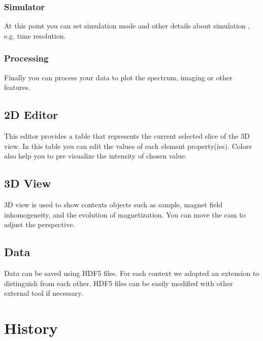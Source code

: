 \documentclass[a4paper,10pt,english]{sphinxmanual}
\begin{document}
\subsection{Simulator}
\label{\detokenize{overview:simulator}}
At this point you can set simulation mode and other details about
simulation , e.g. time resolution.



\subsection{Processing}
\label{\detokenize{overview:processing}}
Finally you can process your data to plot the spectrum, imaging or
other features.



\section{2D Editor}
\label{\detokenize{overview:d-editor}}
This editor provides a table that represents the current selected
slice of the 3D view. In this table you can edit the values of each
element property(ies). Colors also help you to pre visualize the intensity
of chosen value.


\section{3D View}
\label{\detokenize{overview:d-view}}
3D view is used to show contexts objects such as sample, magnet field
inhomogeneity, and the evolution of magnetization. You can move the cam
to adjust the perspective.


\section{Data}
\label{\detokenize{overview:data}}
Data can be saved using HDF5 files. For each context we adopted an
extension to distinguish from each other. HDF5 files can be easily
modified with other external tool if necessary.


\chapter{History}
\label{\detokenize{history:history}}\label{\detokenize{history::doc}}
\end{document}
